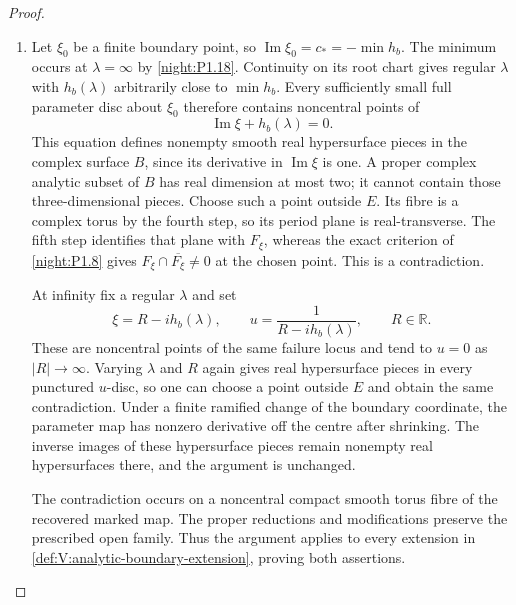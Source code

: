 \documentclass[11pt,a4paper]{article}
\numberwithin{equation}{section}
\theoremstyle{definition}
\begin{document}
\begin{proof}
\begin{enumerate}[label=\arabic*.]
\item Let $\xi_0$ be a finite boundary point, so
$\operatorname{Im}\xi_0=c_*=-\min h_b$.
The minimum occurs at $\lambda=\infty$ by \cref{night:P1.18}.
Continuity on its root chart gives regular $\lambda$ with
$h_b(\lambda)$ arbitrarily close to $\min h_b$.  Every sufficiently small full
parameter disc about $\xi_0$ therefore contains noncentral
points of
\[
 \operatorname{Im}\xi+h_b(\lambda)=0.
\]
This equation defines nonempty smooth real hypersurface
pieces in the complex surface $B$, since its derivative in
$\operatorname{Im}\xi$ is one.  A proper complex analytic
subset of $B$ has real dimension at most two; it cannot
contain those three-dimensional pieces.  Choose such a
point outside $E$.  Its fibre is a complex torus by the fourth
step, so its period plane is real-transverse.  The fifth step
identifies that plane with $F_\xi$, whereas the exact criterion
of \cref{night:P1.8} gives
$F_\xi\cap\overline{F_\xi}\ne0$ at the chosen point.
This is a contradiction.

At infinity fix a regular $\lambda$ and set
\[
 \xi=R-i h_b(\lambda),\qquad
 u=\frac1{R-i h_b(\lambda)},\qquad R\in\mathbb R.
\]
These are noncentral points of the same failure locus and
tend to $u=0$ as $|R|\to\infty$.  Varying $\lambda$ and $R$
again gives real hypersurface pieces in every punctured
$u$-disc, so one can choose a point outside $E$ and obtain the
same contradiction.  Under a finite ramified change of the
boundary coordinate, the parameter map has nonzero derivative
off the centre after shrinking.  The inverse images of these
hypersurface pieces remain nonempty real hypersurfaces there,
and the argument is unchanged.

The contradiction occurs on a noncentral compact smooth torus
fibre of the recovered marked map.  The proper reductions and
modifications preserve the prescribed open family.  Thus the
argument applies to every extension in
\cref{def:V:analytic-boundary-extension}, proving both assertions.
\end{enumerate}
\end{proof}
\end{document}
